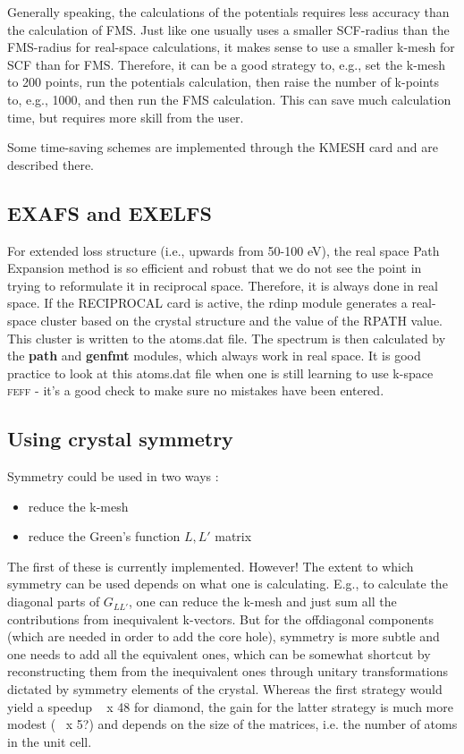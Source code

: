 \documentclass[11pt,oneside]{report} %
\newcommand{\program}[1]{\textsc{#1}}
\newcommand{\feff}{\program{feff}}
\newcommand{\module}[1]{\textrm{\bf{#1}}}
\begin{document}
Generally speaking, the calculations of the potentials requires less accuracy than the calculation of FMS.  Just like one usually uses a smaller SCF-radius than the FMS-radius for real-space calculations, it makes sense to use a smaller k-mesh for SCF than for FMS.  Therefore, it can be a good strategy to, e.g., set the k-mesh to 200 points, run the potentials calculation, then raise the number of k-points to, e.g., 1000, and then run the FMS calculation.  This can save much calculation time, but requires more skill from the user.

Some time-saving schemes are implemented through the KMESH card and are described there.

\subsection{EXAFS and EXELFS}
For extended loss structure (i.e., upwards from 50-100 eV), the real space Path Expansion method is so efficient and robust that we do not see the point in trying to reformulate it in reciprocal space.  Therefore, it is always done in real space.
If the RECIPROCAL card is active, the rdinp module generates a real-space cluster based on the crystal structure and the value of the RPATH value.  This cluster is written to the atoms.dat file.  The spectrum is then calculated by the \module{path} and \module{genfmt} modules, which always work in real space.
It is good practice to look at this atoms.dat file when one is still learning to use k-space {\feff} - it's a good check to make sure no mistakes have been entered.


\subsection{Using crystal symmetry}
Symmetry could be used in two ways :
\begin{itemize} \item	reduce the k-mesh
\item reduce the Green's function $L,L'$ matrix \end{itemize}

The first of these is currently implemented.  However!  The extent to which symmetry can be used depends on what one is calculating.  E.g., to calculate the diagonal parts of $G_{LL'}$, one can reduce the k-mesh and just sum all the contributions from inequivalent k-vectors.  But for the offdiagonal components (which are needed in order to add the core hole), symmetry is more subtle and one needs to add all the equivalent ones, which can be somewhat shortcut by reconstructing them from the inequivalent ones through unitary transformations dictated by symmetry elements of the crystal.  Whereas the first strategy would yield a speedup ~ x 48 for diamond, the gain for the latter strategy is much more modest (~ x 5?) and depends on the size of the matrices, i.e. the number of atoms in the unit cell.
\end{document}
